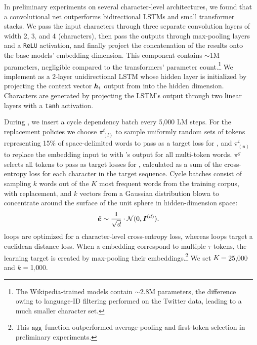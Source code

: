 In preliminary experiments on several character-level \tok{} architectures, we found that a convolutional net outperforms bidirectional LSTMs and small transformer stacks.
We pass the input characters through three separate convolution layers of width 2, 3, and 4 (characters), then pass the outputs through max-pooling layers and a \texttt{ReLU} activation, and finally project the concatenation of the results onto the base models' embedding dimension.
This \tok{} component contains $\sim$1M parameters, negligible compared to the transformers' parameter count.\footnote{The Wikipedia-trained models contain $\sim$2.8M parameters, the difference owing to language-ID filtering performed on the Twitter data, leading to a much smaller character set.} %
We implement \detok{} as a 2-layer unidirectional LSTM whose hidden layer is initialized by projecting the context vector $\bm{h}_i$ output from \mmod{} into the hidden dimension.
Characters are generated by projecting the LSTM's output through two linear layers with a \texttt{tanh} activation.

During \ppt{}, we insert a cycle dependency batch every 5,000 LM steps.
For the replacement policies we choose $\pi^t_{(l)}$ to sample uniformly random sets of tokens representing 15\% of space-delimited words to pass as a target loss
for \tok{}, and $\pi^t_{(u)}$ to replace the embedding input to \mmod{} with \tok{}'s output for all multi-token words.
$\pi^g$ selects all tokens to pass as target losses for \detok{}, calculated as a sum of the cross-entropy loss for each character in the target sequence.
Cycle batches consist of sampling $k$ words out of the $K$ most frequent words from the training corpus, with replacement, and $k$ vectors from a Gaussian distribution blown to concentrate around the surface of the unit sphere in hidden-dimension space:
\[ \tilde{\bm{e}} \sim \frac{1}{\sqrt{d}}\cdot\mathcal{N}(0,\bm{I}^{(d)}). \]
\tdloop{} loops are optimized for a
character-level cross-entropy
loss, whereas \dtloop{} loops target a
euclidean distance loss.
When a \tok{} embedding correspond to multiple $\tau$ tokens, the learning target is created by max-pooling their embeddings.\footnote{This $\operatorname*{agg}$ function outperformed average-pooling and first-token selection in preliminary experiments.}
We set $K=$25,000 and $k=$1,000.


